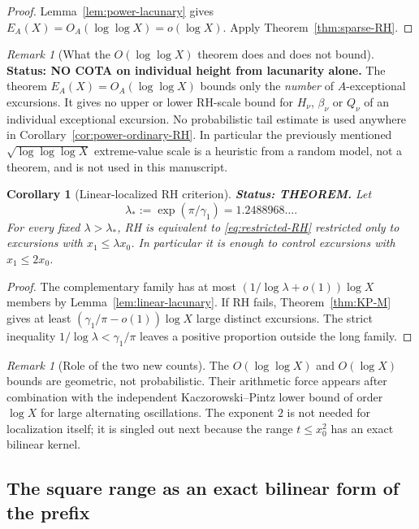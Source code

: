 \documentclass[11pt]{amsart}
\numberwithin{equation}{section}
\theoremstyle{plain}
\newtheorem{corollary}[theorem]{Corollary}
\theoremstyle{definition}
\theoremstyle{remark}
\newtheorem{remark}[theorem]{Remark}
\begin{document}
\begin{proof}
Lemma~\ref{lem:power-lacunary} gives $E_A(X)=O_A(\log\log X)=o(\log X)$.
Apply Theorem~\ref{thm:sparse-RH}.
\end{proof}

\begin{remark}[What the $O(\log\log X)$ theorem does and does not bound]
\label{rem:no-height-from-lacunarity}
\textbf{Status: NO COTA on individual height from lacunarity alone.}
The theorem $E_A(X)=O_A(\log\log X)$ bounds only the \emph{number} of
$A$-exceptional excursions. It gives no upper or lower RH-scale bound for
$H_\nu$, $\beta_\nu$ or $Q_\nu$ of an individual exceptional excursion.
No probabilistic tail estimate is used anywhere in
Corollary~\ref{cor:power-ordinary-RH}. In particular the previously
mentioned $\sqrt{\log\log\log X}$ extreme-value scale is a heuristic
from a random model, not a theorem, and is not used in this manuscript.
\end{remark}

\begin{corollary}[Linear-localized RH criterion]
\label{cor:linear-ordinary-RH}
\textbf{Status: THEOREM.} Let
\[
\lambda_*:=\exp(\pi/\gamma_1)=1.2488968\ldots .
\]
For every fixed $\lambda>\lambda_*$, RH is equivalent to
\eqref{eq:restricted-RH} restricted only to excursions with
$x_1\le\lambda x_0$. In particular it is enough to control excursions with
$x_1\le2x_0$.
\end{corollary}

\begin{proof}
The complementary family has at most
$(1/\log\lambda+o(1))\log X$ members by
Lemma~\ref{lem:linear-lacunary}. If RH fails, Theorem~\ref{thm:KP-M} gives
at least $(\gamma_1/\pi-o(1))\log X$ large distinct excursions. The strict
inequality $1/\log\lambda<\gamma_1/\pi$ leaves a positive proportion outside
the long family.
\end{proof}

\begin{remark}[Role of the two new counts]
\label{rem:two-counts}
The $O(\log\log X)$ and $O(\log X)$ bounds are geometric, not probabilistic.
Their arithmetic force appears after combination with the independent
Kaczorowski--Pintz lower bound of order $\log X$ for large alternating
oscillations. The exponent $2$ is not needed for localization itself; it is
singled out next because the range $t\le x_0^2$ has an exact bilinear kernel.
\end{remark}

\subsection{The square range as an exact bilinear form of the prefix}
\end{document}
